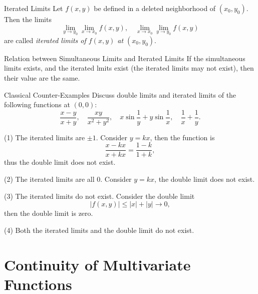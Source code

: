 \begin{definition}{Iterated Limits}{}
  Let $f(x, y)$ be defined in a deleted neighborhood of $(x_0, y_0)$.
  Then the limits
  \begin{equation}
    \lim \limits _{y \rightarrow y_0} \lim \limits _{x \rightarrow x_0} f(x,y), \quad
    \lim \limits _{x \rightarrow x_0} \lim \limits _{y\rightarrow y_0} f(x,y)
  \end{equation}
  are called \emph{iterated limits of $f(x,y)$ at $(x_0, y_0)$}.
\end{definition}

\begin{proposition}{Relation between Simultaneous Limits and Iterated Limits}{}
  If the simultaneous limits exists,
  and the iterated lmits exist (the iterated limits may not exist),
  then their value are the same.
\end{proposition}

\begin{example}{Classical Counter-Examples}{}
  Discuss double limits and iterated limits of the following functions at $(0, 0)$:
  \begin{equation}
    \frac{x - y}{x + y}, \quad
    \frac{xy}{x^2 + y^2}, \quad
    x \sin \frac{1}{y} + y \sin \frac{1}{x}, \quad
    \frac{1}{x} + \frac{1}{y}.
  \end{equation}
\end{example}

\begin{solution}
  (1) The iterated limits are $\pm 1$.
  Consider $y = kx$, then the function is
  \begin{equation}
    \frac{x - kx}{x + kx} = \frac{1 - k}{1 + k},
  \end{equation}
  thus the double limit does not exist.

  (2) The iterated limits are all $0$.
  Consider $y = kx$, the double limit does not exist.

  (3) The iterated limits do not exist.
  Consider the double limit
  \begin{equation}
    |f(x, y)| \leq |x| + |y| \rightarrow 0,
  \end{equation}
  then the double limit is zero.

  (4) Both the iterated limits and the double limit do not exist.
\end{solution}

\section{Continuity of Multivariate Functions}

